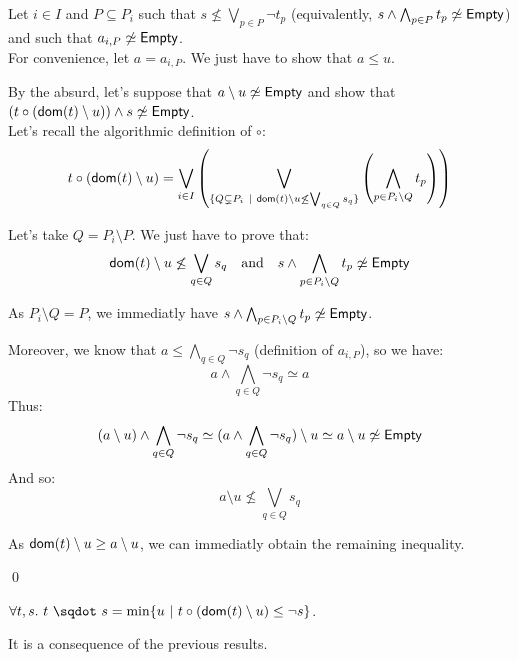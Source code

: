 \documentclass[a4paper]{article}%
\begin{document}
    Let $i \in I$ and $P \subseteq P_i$ such that $s \not\leq \bigvee_{p \in P} \neg t_p$ (equivalently, $s \land \bigwedge_{p \in P} t_p \not\simeq \textsf{Empty}$) and such that $a_{i,P} \not\simeq \textsf{Empty}$.\\
    For convenience, let $a = a_{i,P}$. We just have to show that $a \leq u$.

    By the absurd, let's suppose that $a \setminus u \not\simeq \textsf{Empty}$ and show that $(t\circ(\textsf{dom}(t) \setminus u)) \land s \not\simeq \textsf{Empty}$.\\

    Let's recall the algorithmic definition of $\circ$:
    \[t\circ(\textsf{dom}(t) \setminus u) = \bigvee_{i\in I}\left(\bigvee_{\{Q\subsetneq P_i~|~ \textsf{dom}(t) \setminus u \not\leq\bigvee_{q\in Q}s_q\}}\left(\bigwedge_{p\in P_i\setminus Q}t_p\right)\right)\]

    Let's take $Q = P_i \setminus P$. We just have to prove that:
    \[ \textsf{dom}(t) \setminus u \not\leq\bigvee_{q\in Q}s_q \text{\ \ \ and\ \ \ } s \land \bigwedge_{p\in P_i\setminus Q}t_p \not\simeq \textsf{Empty} \]

    As $P_i \setminus Q = P$, we immediatly have $s \land \bigwedge_{p\in P_i\setminus Q}t_p \not\simeq \textsf{Empty}$.

    Moreover, we know that $a \leq \bigwedge_{q \in Q} \neg s_q$ (definition of $a_{i,P}$), so we have:
    \[a \land \bigwedge_{q\in Q} \neg s_q \simeq a\]
    Thus: \[(a \setminus u) \land \bigwedge_{q\in Q} \neg s_q \simeq (a \land \bigwedge_{q\in Q} \neg s_q) \setminus u \simeq a \setminus u \not\simeq \textsf{Empty}\]
    And so: \[ a \setminus u \not\leq \bigvee_{q\in Q}s_q \]

    As $ \textsf{dom}(t) \setminus u \geq a \setminus u$, we can immediatly obtain the remaining inequality.

    \qed

    \begin{theorem}
        $\forall t, s.\ \worra t s = \min \{ u \alt \apply t {(\dom t \setminus u)} \leq \neg s \}$.
    \end{theorem}

    It is a consequence of the previous results.

    
\end{document}

